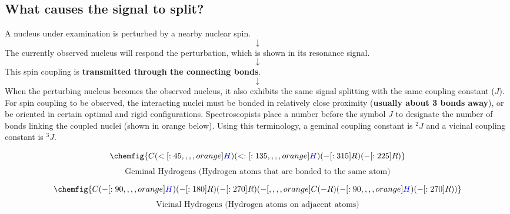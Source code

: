 \documentclass[11pt]{article}
\begin{document}
\newpage

\subsection{What causes the signal to split?}
\label{sec:org9089750}
A nucleus under examination is perturbed by a nearby nuclear spin.
\[\downarrow\]
The currently observed nucleus will respond the perturbation, which is shown in its resonance signal.
\[\downarrow\]
This spin coupling is \textbf{transmitted through the connecting bonds}.
\[\downarrow\]
When the perturbing nucleus becomes the observed nucleus, it also exhibits the same signal splitting with the same coupling constant (\(J\)).
\\[0pt]

For spin coupling to be observed, the interacting nuclei must be bonded in relatively close proximity (\textbf{usually about 3 bonds away}), or be oriented in certain optimal and rigid configurations. Spectroscopists place a number before the symbol \(J\) to designate the number of bonds linking the coupled nuclei (shown in orange below). Using this terminology, a geminal coupling constant is \(^2J\) and a vicinal coupling constant is \(^3J\).

\[\chemfig{C(<[:45,,,,orange]{\color{blue}H})(<:[:135,,,,orange]{\color{blue}H})(-[:315]R)(-[:225]R)}\]
\[\text{Geminal Hydrogens (Hydrogen atoms that are bonded to the same atom)}\]

\[
\chemfig{C(-[:90,,,,orange]{\color{blue}H})(-[:180]R)(-[:270]R)
(-[,,,,orange]C(-R)(-[:90,,,,orange]{\color{blue}H})(-[:270]R))}
\]
\[\text{Vicinal Hydrogens (Hydrogen atoms on adjacent atoms)}\]
\end{document}
